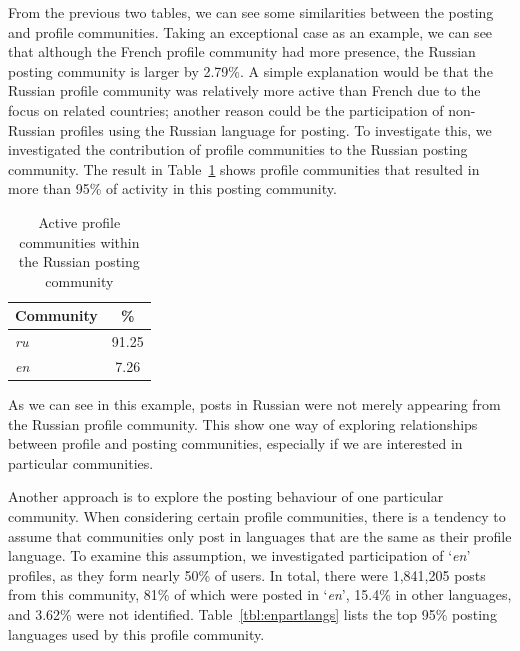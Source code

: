 From the previous two tables, we can see some similarities between the
posting and profile communities. Taking an exceptional case as an
example, we can see that although the French profile community had
more presence, the Russian posting community is larger by 2.79\%. A
simple explanation would be that the Russian profile community was
relatively more active than French due to the focus on related
countries; another reason could be the participation of non-Russian
profiles using the Russian language for posting. To investigate this,
we investigated the contribution of profile communities to the Russian
posting community. The result in Table~\ref{tbl:russian} shows profile
communities that resulted in more than 95\% of activity in this
posting community.


\begin{table}[!htb]
\centering
\begin{tabular}{@{}lc}
\toprule
\textbf{Community} & \textbf{\%} \\ 
\midrule
{\emph{ru}} & 91.25 \\
{\emph{en}} & 7.26 \\
\bottomrule
\end{tabular}
\caption{Active profile communities within the Russian posting community}
\label{tbl:russian}
\end{table}


As we can see in this example, posts in Russian were not merely
appearing from the Russian profile community. This show one way of
exploring relationships between profile and posting communities,
especially if we are interested in particular communities.

Another approach is to explore the posting behaviour of one particular
community. When considering certain profile communities, there is a
tendency to assume that communities only post in languages that are
the same as their profile language. To examine this assumption, we
investigated participation of `{\emph{en}}' profiles, as they form
nearly 50\% of users. In total, there were 1,841,205 posts from this
community, 81\% of which were posted in `{\emph{en}}', 15.4\% in other
languages, and 3.62\% were not identified. Table~\ref{tbl:enpartlangs}
lists the top 95\% posting languages used by this profile community.


